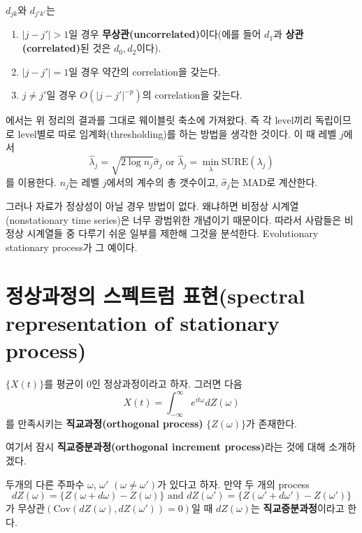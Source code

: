 \documentclass[b5paper,]{scrbook}
\theoremstyle{plain}
\theoremstyle{definition}
\numberwithin{equation}{section}
\let\BeginKnitrBlock\begin \let\EndKnitrBlock\end
\begin{document}
\BeginKnitrBlock{theorem}[정상과정의 백색화]
\protect\hypertarget{thm:unnamed-chunk-323}{}{\label{thm:unnamed-chunk-323} {} }\(d_{jk}\)와 \(d_{j'k'}\)는

\begin{enumerate}
\def\labelenumi{\arabic{enumi}.}
\item
  \(|j-j'|>1\)일 경우 \textbf{무상관(uncorrelated)}이다(에를 들어 \(d_{1}\)과 \textbf{상관(correlated)}된 것은 \(d_{0}, d_{2}\)이다).
\item
  \(|j-j'|=1\)일 경우 약간의 correlation을 갖는다.
\item
  \(j \neq j'\)일 경우 \(O(|j-j'|^{-p})\)의 correlation을 갖는다.
\end{enumerate}
\EndKnitrBlock{theorem}

\citep{Johnstone1997}에서는 위 정리의 결과를 그대로 웨이블릿 축소에 가져왔다. 즉 각 level끼리 독립이므로 level별로 따로 임계화(thresholding)를 하는 방법을 생각한 것이다. 이 때 레벨 \(j\)에서
\[\hat{\lambda}_{j}=\sqrt{2\log n_{j}}\hat{\sigma}_{j} \text{ or } \hat{\lambda}_{j}=\min_{\lambda}\text{SURE}(\lambda_{j})\]
를 이용한다. \(n_{j}\)는 레벨 \(j\)에서의 계수의 총 갯수이고, \(\hat{\sigma}_{j}\)는 MAD로 계산한다.

그러나 자료가 정상성이 아닐 경우 방법이 없다. 왜냐하면 비정상 시계열(nonstationary time series)은 너무 광범위한 개념이기 때문이다. 따라서 사람들은 비정상 시계열들 중 다루기 쉬운 일부를 제한해 그것을 분석한다. Evolutionary stationary process가 그 예이다.

\hypertarget{--spectral-representation-of-stationary-process}{%
\section{정상과정의 스펙트럼 표현(spectral representation of stationary process)}\label{--spectral-representation-of-stationary-process}}

\(\{ X(t) \}\)를 평균이 0인 정상과정이라고 하자. 그러면 다음
\[X(t)=\int_{-\infty}^{\infty} e^{it\omega}dZ(\omega)\]
를 만족시키는 \textbf{직교과정(orthogonal process)} \(\{Z(\omega)\}\)가 존재한다.

여기서 잠시 \textbf{직교증분과정(orthogonal increment process)}라는 것에 대해 소개하겠다.

\BeginKnitrBlock{definition}[직교증분과정]
\protect\hypertarget{def:unnamed-chunk-324}{}{\label{def:unnamed-chunk-324} {} }두개의 다른 주파수 \(\omega\), \(\omega'\) \((\omega \neq \omega')\)가 있다고 하자. 만약 두 개의 process
\[dZ(\omega)=\{Z(\omega +d\omega)-Z(\omega)\} \text{ and } dZ(\omega')=\{Z(\omega' +d\omega')-Z(\omega')\}\]
가 무상관\((\text{Cov}(dZ(\omega), dZ(\omega'))=0)\)일 때 \(dZ(\omega)\)는 \textbf{직교증분과정}이라고 한다.
\EndKnitrBlock{definition}
\end{document}
